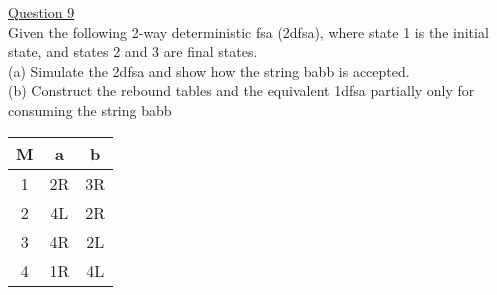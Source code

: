 \documentclass{article}
\begin{document}
\underline{Question 9}\\
Given the following 2-way deterministic fsa (2dfsa), where state 1 is the initial state, 
and states 2 and 3 are final states.\\
(a) Simulate the 2dfsa and show how the string babb is accepted.\\ 
(b) Construct the rebound tables and the equivalent 1dfsa partially only for consuming 
the string babb\\
 \center \begin{tabular}{|c|c|c|}
\hline 
M & a & b\tabularnewline
\hline 
\hline 
1 & 2R& 3R\tabularnewline
\hline 
2 & 4L  & 2R\tabularnewline
\hline 
3 & 4R & 2L \tabularnewline
\hline 
4 & 1R &  4L\tabularnewline
\hline 
\end{tabular}\\
\end{document}
